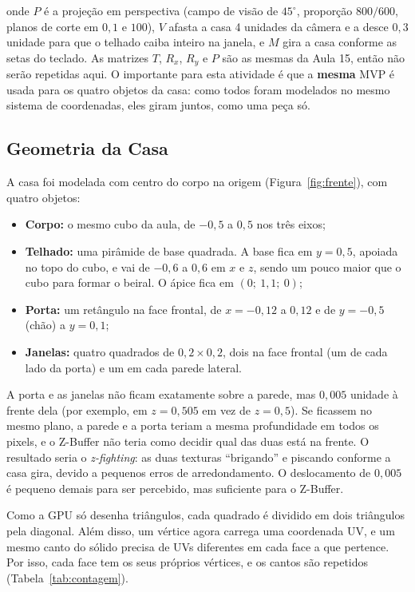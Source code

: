 \documentclass{article}
\begin{document}
\noindent onde $P$ é a projeção em perspectiva (campo de visão de $45^\circ$, proporção $800/600$, planos de corte em $0{,}1$ e $100$), $V$ afasta a casa 4 unidades da câmera e a desce $0{,}3$ unidade para que o telhado caiba inteiro na janela, e $M$ gira a casa conforme as setas do teclado. As matrizes $T$, $R_x$, $R_y$ e $P$ são as mesmas da Aula 15, então não serão repetidas aqui. O importante para esta atividade é que a \textbf{mesma} MVP é usada para os quatro objetos da casa: como todos foram modelados no mesmo sistema de coordenadas, eles giram juntos, como uma peça só.

\subsection{Geometria da Casa}\label{sec:geometria}

A casa foi modelada com centro do corpo na origem (Figura~\ref{fig:frente}), com quatro objetos:

\begin{itemize}
    \item \textbf{Corpo:} o mesmo cubo da aula, de $-0{,}5$ a $0{,}5$ nos três eixos;
    \item \textbf{Telhado:} uma pirâmide de base quadrada. A base fica em $y = 0{,}5$, apoiada no topo do cubo, e vai de $-0{,}6$ a $0{,}6$ em $x$ e $z$, sendo um pouco maior que o cubo para formar o beiral. O ápice fica em $(0;\ 1{,}1;\ 0)$;
    \item \textbf{Porta:} um retângulo na face frontal, de $x = -0{,}12$ a $0{,}12$ e de $y = -0{,}5$ (chão) a $y = 0{,}1$;
    \item \textbf{Janelas:} quatro quadrados de $0{,}2\times0{,}2$, dois na face frontal (um de cada lado da porta) e um em cada parede lateral.
\end{itemize}

A porta e as janelas não ficam exatamente sobre a parede, mas $0{,}005$ unidade à frente dela (por exemplo, em $z = 0{,}505$ em vez de $z = 0{,}5$). Se ficassem no mesmo plano, a parede e a porta teriam a mesma profundidade em todos os pixels, e o Z-Buffer não teria como decidir qual das duas está na frente. O resultado seria o \textit{z-fighting}: as duas texturas ``brigando'' e piscando conforme a casa gira, devido a pequenos erros de arredondamento. O deslocamento de $0{,}005$ é pequeno demais para ser percebido, mas suficiente para o Z-Buffer.

Como a GPU só desenha triângulos, cada quadrado é dividido em dois triângulos pela diagonal. Além disso, um vértice agora carrega uma coordenada UV, e um mesmo canto do sólido precisa de UVs diferentes em cada face a que pertence. Por isso, cada face tem os seus próprios vértices, e os cantos são repetidos (Tabela~\ref{tab:contagem}).
\end{document}
